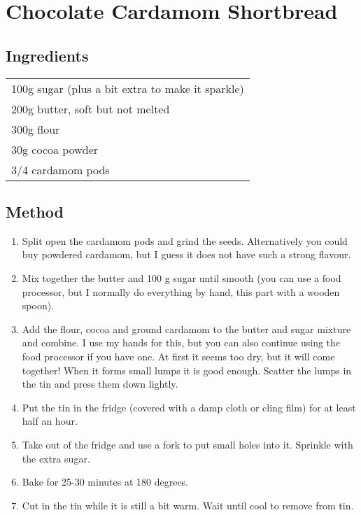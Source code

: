 \section{Chocolate Cardamom Shortbread}

\subsection*{Ingredients}
\begin{tabular}{ l }
  100g sugar  (plus a bit extra to make it sparkle) \\
  200g butter, soft but not melted \\
  300g flour \\
  30g cocoa powder \\
  3/4 cardamom pods \\
\end{tabular}

\subsection*{Method}
\begin{enumerate}
	\item Split open the cardamom pods and grind the seeds. Alternatively you could buy powdered cardamom, but I guess it does not have such a strong flavour.
  \item Mix together the butter and 100 g sugar until smooth (you can use a food processor, but I normally do everything by hand, this part with a wooden spoon).
  \item Add the flour, cocoa and ground cardamom to the butter and sugar mixture and combine. I use my hands for this, but you can also continue using the food processor if you have one. At first it seems too dry, but it will come together! When it forms small lumps it is good enough. Scatter the lumps in the tin and press them down lightly.
  \item Put the tin in the fridge (covered with a damp cloth or cling film) for at least half an hour.
  \item Take out of the fridge and use a fork to put small holes into it. Sprinkle with the extra sugar.
  \item Bake for 25-30 minutes at 180 degrees.
  \item Cut in the tin while it is still a bit warm. Wait until cool to remove from tin.
\end{enumerate}
